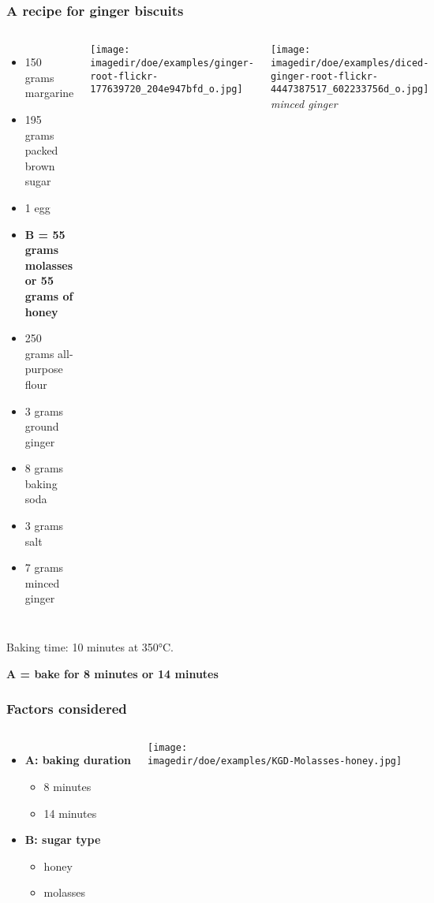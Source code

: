 \documentclass[handout,11pt,aspectratio=169,mathserif]{beamer}
\begin{document}
\begin{frame}\frametitle{A recipe for ginger biscuits}
	\begin{columns}[t]
			\begin{itemize}
				\item	150 grams margarine
				\item	195 grams packed brown sugar
				\item	1 egg
				\item		\textbf{B = 55 grams molasses or 55 grams of honey}
				\item	250 grams all-purpose flour
				\item	3 grams ground ginger
				\item	8 grams baking soda
				\item	3 grams salt
				\item	7 grams minced ginger
			\end{itemize}
		
			\texttt{[image: \\imagedir/doe/examples/ginger-root-flickr-177639720\_204e947bfd\_o.jpg]}
			
			\texttt{[image: \\imagedir/doe/examples/diced-ginger-root-flickr-4447387517\_602233756d\_o.jpg]}
			\\
			
			\emph{minced ginger}
	\end{columns}
		
	Baking time: 10 minutes at 350°C.
	
	\vspace{12pt}
	\textbf{A = bake for 8 minutes or 14 minutes}
\end{frame}

\begin{frame}\frametitle{Factors considered}	
	\begin{columns}[b]
			\begin{itemize}
				\item	\textbf{A: baking duration}
					\begin{itemize}
						\item	8 minutes
						\item	14 minutes
					\end{itemize}
					
				\vspace{24pt}
				\item	\textbf{B: sugar type}
				\begin{itemize}
					\item	honey
					\item	molasses
				\end{itemize}
			\end{itemize}
			\texttt{[image: \\imagedir/doe/examples/KGD-Molasses-honey.jpg]}
	\end{columns}
\end{frame}
\end{document}
